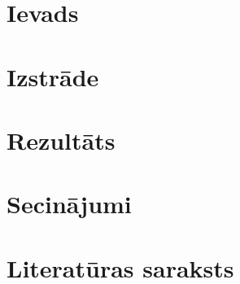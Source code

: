 \documentclass[12pt,a4paper,oneside]{article}
\begin{document}



\clearpage
\tableofcontents
\clearpage

\newpage
\section{Ievads}


\newpage
\section{Izstrāde}


\newpage
\section{Rezultāts}


\newpage
\section{Secinājumi}


\newpage
\section{Literatūras saraksts}
\printbibliography[heading=none]

\newpage
\appendix

\end{document}
